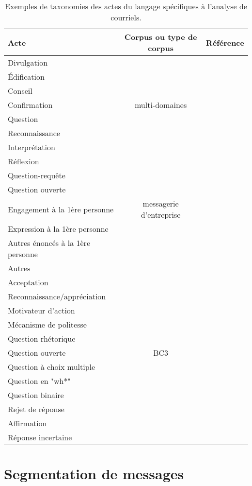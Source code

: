 \begin{table}
	\begin{tabularx}{\textwidth}{Y c c}
		\toprule
		Acte & Corpus ou type de corpus & Référence \\
		\midrule
		Divulgation &  & \\
		Édification &  & \\
		Conseil &  & \\
		Confirmation & multi-domaines & \cite{Lampert_classifyingspeech} \\
		Question &  & \\
		Reconnaissance &  & \\
		Interprétation &  & \\
		Réflexion &  & \\
		\midrule					
		Question-requête &  & \\
		Question ouverte &  & \\
		Engagement à la 1ère personne & messagerie d'entreprise & \cite{de2013classification} \\
		Expression à la 1ère personne &  & \\
		Autres énoncés à la 1ère personne &  & \\
		Autres &  & \\
		\midrule
		Acceptation &  & \\
		Reconnaissance/appréciation &  & \\
		Motivateur d'action &  & \\
		Mécanisme de politesse &  & \\
		Question rhétorique &  & \\
		Question ouverte & BC3 & \cite{JanAAAI08} \\
		Question à choix multiple &  & \\
		Question en "wh*" &  & \\
		Question binaire &  & \\
		Rejet de réponse &  & \\
		Affirmation &  & \\
		Réponse incertaine &  & \\
		\bottomrule
	\end{tabularx}
	\caption{Exemples de taxonomies des actes du langage spécifiques à l'analyse de courriels.}
	\label{fig:emailTaxonomies}
\end{table}

\section{Segmentation de messages}

